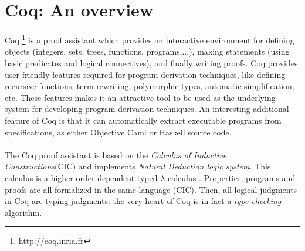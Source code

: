 \section{Coq: An overview}
Coq \footnote{\url{http://coq.inria.fr}} is a proof assistant which provides an interactive environment for defining objects (integers, sets, trees, functions, programs,...), making statements (using basic predicates and logical connectives), and finally writing proofs. Coq provides user-friendly features required for program derivation techniques, like defining recursive functions, term rewriting, polymorphic types, automatic simplification, etc. These features makes it an attractive tool to be used as the underlying system for developing program derivation techniques. An interesting additional feature of Coq is that it can automatically extract executable programs from specifications, as either Objective Caml or Haskell source code. \\\\
The Coq proof assistant is based on the \emph{Calculus of Inductive Constructions}(CIC) \cite{coquand1988calculus} and implements \emph{Natural Deduction logic system}. This calculus is a higher-order dependent typed $\lambda$-calculus \cite{pierce2002types}. Properties, programs and proofs are all formalized in the same language (CIC). Then, all logical judgments in Coq are typing judgments: the very heart of Coq is in fact a \emph{type-checking} algorithm.

